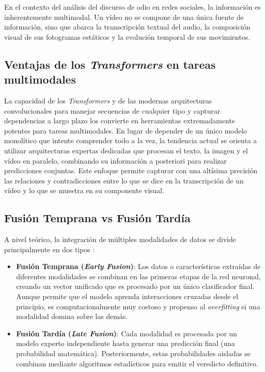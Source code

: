 En el contexto del análisis del discurso de odio en redes sociales, la información es inherentemente multimodal. Un vídeo no se compone de una única fuente de información, sino que abarca la transcripción textual del audio, la composición visual de sus fotogramas estáticos y la evolución temporal de sus movimientos. 

\subsection{Ventajas de los \textit{Transformers} en tareas multimodales}
\label{subsec:VentajaDeLosTransformersEnTareasMultimodales}
La capacidad de los \textit{Transformers} y de las modernas arquitecturas convolucionales para manejar secuencias de cualquier tipo y capturar dependencias a largo plazo los convierte en herramientas extremadamente potentes para tareas multimodales. En lugar de depender de un único modelo monolítico que intente comprender todo a la vez, la tendencia actual se orienta a utilizar arquitecturas expertas dedicadas que procesan el texto, la imagen y el vídeo en paralelo, combinando su información a posteriori para realizar predicciones conjuntas. Este enfoque permite capturar con una altísima precisión las relaciones y contradicciones entre lo que se dice en la transcripción de un vídeo y lo que se muestra en su componente visual. 

\subsection{Fusión Temprana vs Fusión Tardía}
\label{subsec:FusionTempranaVsFusionTardia}
A nivel teórico, la integración de múltiples modalidades de datos se divide principalmente en dos tipos \cite{ramachandram2017deep}: 
\begin{itemize}
    \item \textbf{Fusión Temprana (\textit{Early Fusion})}: Los datos o características extraídas de diferentes modalidades se combinan en las primeras etapas de la red neuronal, creando un vector unificado que es procesado por un único clasificador final. Aunque permite que el modelo aprenda interacciones cruzadas desde el principio, es computacionalmente muy costoso y propenso al \textit{overfitting} si una modalidad domina sobre las demás.
    \item \textbf{Fusión Tardía (\textit{Late Fusion})}: Cada modalidad es procesada por un modelo experto independiente hasta generar una predicción final (una probabilidad matemática). Posteriormente, estas probabilidades aisladas se combinan mediante algoritmos estadísticos para emitir el veredicto definitivo. 
\end{itemize}

